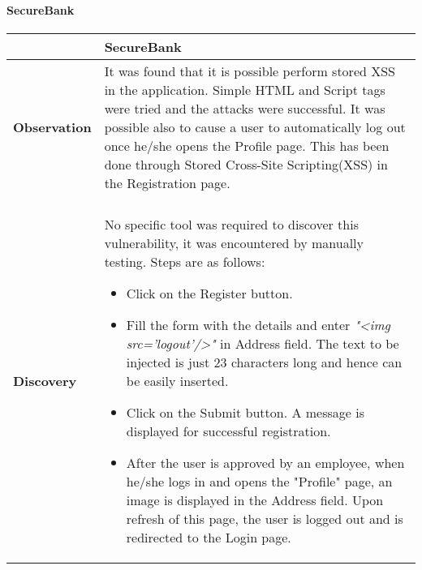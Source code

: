 \paragraph{SecureBank} \mbox{}
\begin{longtable*}{p{.30\textwidth} | p{.70\textwidth}}
    \hline
    & \textbf{SecureBank} \\
    \hline
    \textbf{Observation} &
           It was found that it is possible perform stored XSS in the application. Simple HTML and Script tags were tried and the attacks were successful.
           It was possible also to cause a user to automatically log out once he/she opens the Profile page. This has been done through Stored Cross-Site Scripting(XSS) in the Registration page.
    \\\\
    \textbf{Discovery} &
      No specific tool was required to discover this vulnerability, it was encountered by manually testing. Steps are as follows:
       \begin{itemize}
	       \item Click on the Register button.

	       \item Fill the form with the details and enter \textit{"<img src='logout'/>"} in Address field. The text to be injected is just 23 characters long and hence can be easily inserted.

	       \item Click on the Submit button. A message is displayed for successful registration.

	       \item After the user is approved by an employee, when he/she logs in and opens the "Profile" page, an image is displayed in the Address field. Upon refresh of this page, the user is logged out and is redirected to the Login page.
       \end{itemize}


\end{longtable*}
